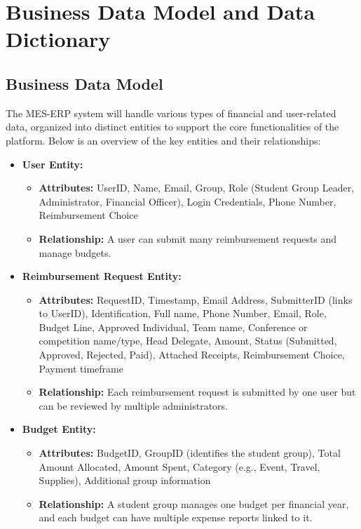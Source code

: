 \documentclass[12pt]{article}
\begin{document}
\section{Business Data Model and Data Dictionary}
\subsection{Business Data Model}
The MES-ERP system will handle various types of financial and user-related data, organized into distinct entities to support the core functionalities of the platform. Below is an overview of the key entities and their relationships:

\begin{itemize}
    \item \textbf{User Entity:}
    \begin{itemize}
        \item \textbf{Attributes:} UserID, Name, Email, Group, Role (Student Group Leader, Administrator, Financial Officer), Login Credentials, Phone Number, Reimbursement Choice 
        \item \textbf{Relationship:} A user can submit many reimbursement requests and manage budgets.
    \end{itemize}
    
    \item \textbf{Reimbursement Request Entity:}
    \begin{itemize}
        \item \textbf{Attributes:} RequestID, Timestamp, Email Address, SubmitterID (links to UserID), Identification, Full name, Phone Number, Email, Role, Budget Line, Approved Individual, Team name, Conference or competition name/type, Head Delegate, Amount, Status (Submitted, Approved, Rejected, Paid), Attached Receipts, Reimbursement Choice, Payment timeframe
        \item \textbf{Relationship:} Each reimbursement request is submitted by one user but can be reviewed by multiple administrators.
    \end{itemize}
    
    \item \textbf{Budget Entity:}
    \begin{itemize}
        \item \textbf{Attributes:} BudgetID, GroupID (identifies the student group), Total Amount Allocated, Amount Spent, Category (e.g., Event, Travel, Supplies), Additional group information
        \item \textbf{Relationship:} A student group manages one budget per financial year, and each budget can have multiple expense reports linked to it.
    \end{itemize}


\end{itemize}
\end{document}
